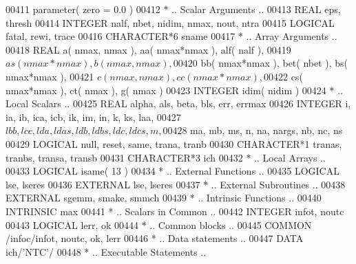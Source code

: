 \begin{DoxyCode}
00411       parameter( zero = 0.0 )
00412 \textcolor{comment}{*     .. Scalar Arguments ..}
00413       \textcolor{keywordtype}{REAL}               eps, thresh
00414       \textcolor{keywordtype}{INTEGER}            nalf, nbet, nidim, nmax, nout, ntra
00415       \textcolor{keywordtype}{LOGICAL}            fatal, rewi, trace
00416       \textcolor{keywordtype}{CHARACTER*6}        sname
00417 \textcolor{comment}{*     .. Array Arguments ..}
00418       \textcolor{keywordtype}{REAL}               a( nmax, nmax ), aa( nmax*nmax ), alf( nalf ),
00419      $                   as( nmax*nmax ), b( nmax, nmax ),
00420      $                   bb( nmax*nmax ), bet( nbet ), bs( nmax*nmax ),
00421      $                   c( nmax, nmax ), cc( nmax*nmax ),
00422      $                   cs( nmax*nmax ), ct( nmax ), g( nmax )
00423       \textcolor{keywordtype}{INTEGER}            idim( nidim )
00424 \textcolor{comment}{*     .. Local Scalars ..}
00425       \textcolor{keywordtype}{REAL}               alpha, als, beta, bls, err, errmax
00426       \textcolor{keywordtype}{INTEGER}            i, ia, ib, ica, icb, ik, im, in, k, ks, laa,
00427      $                   lbb, lcc, lda, ldas, ldb, ldbs, ldc, ldcs, m,
00428      $                   ma, mb, ms, n, na, nargs, nb, nc, ns
00429       \textcolor{keywordtype}{LOGICAL}            null, reset, same, trana, tranb
00430       \textcolor{keywordtype}{CHARACTER*1}        tranas, tranbs, transa, transb
00431       \textcolor{keywordtype}{CHARACTER*3}        ich
00432 \textcolor{comment}{*     .. Local Arrays ..}
00433       \textcolor{keywordtype}{LOGICAL}            isame( 13 )
00434 \textcolor{comment}{*     .. External Functions ..}
00435       \textcolor{keywordtype}{LOGICAL}            lse, lseres
00436       \textcolor{keywordtype}{EXTERNAL}           lse, lseres
00437 \textcolor{comment}{*     .. External Subroutines ..}
00438       \textcolor{keywordtype}{EXTERNAL}           sgemm, smake, smmch
00439 \textcolor{comment}{*     .. Intrinsic Functions ..}
00440       \textcolor{keywordtype}{INTRINSIC}          max
00441 \textcolor{comment}{*     .. Scalars in Common ..}
00442       \textcolor{keywordtype}{INTEGER}            infot, noutc
00443       \textcolor{keywordtype}{LOGICAL}            lerr, ok
00444 \textcolor{comment}{*     .. Common blocks ..}
00445       \textcolor{keyword}{COMMON}             /infoc/infot, noutc, ok, lerr
00446 \textcolor{comment}{*     .. Data statements ..}
00447       \textcolor{keyword}{DATA}               ich/\textcolor{stringliteral}{'NTC'}/
00448 \textcolor{comment}{*     .. Executable Statements ..}

\end{DoxyCode}
